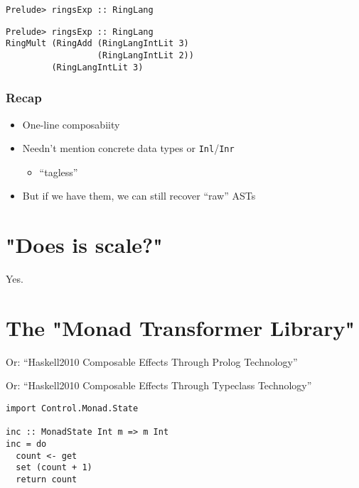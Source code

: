 \documentclass[pdf]{beamer}
\begin{document}
\begin{frame}[fragile]
\begin{lstlisting}
Prelude> ringsExp :: RingLang

\end{lstlisting}
\end{frame}

\begin{frame}[fragile]
\begin{lstlisting}
Prelude> ringsExp :: RingLang
RingMult (RingAdd (RingLangIntLit 3) 
                  (RingLangIntLit 2)) 
         (RingLangIntLit 3)
\end{lstlisting}
\end{frame}

\begin{frame}
  \frametitle{Recap}
  \begin{itemize}
  \pause
  \item One-line composabiity
  \pause
  \item Needn't mention concrete data types or \lstinline{Inl}/\lstinline{Inr}
    \pause
    \begin{itemize}
    \item ``tagless''
    \end{itemize}
  \pause
  \item But if we have them, we can still recover ``raw'' ASTs
  \end{itemize}
\end{frame}

\section{"Does is scale?"}

\begin{frame}
  Yes.
\end{frame}

\section{The "Monad Transformer Library"}

\begin{frame}
  Or: ``Haskell2010 Composable Effects Through Prolog Technology''
\end{frame}

\begin{frame}
  Or: ``Haskell2010 Composable Effects Through Typeclass Technology''
\end{frame}

\begin{frame}[fragile]
\begin{lstlisting}
import Control.Monad.State

inc :: MonadState Int m => m Int
inc = do
  count <- get
  set (count + 1)
  return count
\end{lstlisting}
\end{frame}
\end{document}
